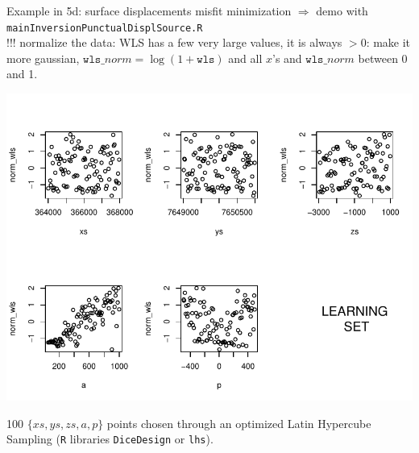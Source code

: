 \begin{frame}{}
\begin{exampleblock}{Example in 5d: surface displacements misfit minimization}
$\Rightarrow$ demo with \texttt{mainInversionPunctualDisplSource.R}\\
!!! normalize the data: WLS has a few very large values, it is always $>0$: make it more gaussian, 
$\mathtt{wls}\_norm = \log(1+\mathtt{wls})$ and all $x$'s and $\mathtt{wls}\_norm$ between 0 and 1.
\begin{minipage}[c]{0.6\textwidth}
\begin{center}
\includegraphics[width=\textwidth]{4_optimization/figures/misfit_learn_set} 
\end{center}
\end{minipage}
\hspace{0.3cm}
\begin{minipage}[c]{0.30\textwidth}
{\small 100 $\{xs,ys,zs,a,p\}$ points chosen through an optimized Latin Hypercube Sampling 
(\texttt{R} libraries \texttt{DiceDesign} or \texttt{lhs}).}\\
\end{minipage}
\end{exampleblock}
\end{frame}

